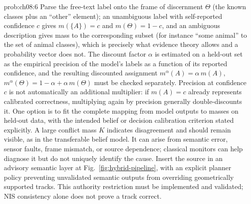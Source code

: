 \begin{sol}{prob:ch08:6}
Parse the free-text label onto the frame of discernment $\Theta$ (the known classes plus an ``other'' element); an unambiguous label with self-reported confidence $c$ gives $m(\{A\})=c$ and $m(\Theta)=1-c$, and an ambiguous description gives mass to the corresponding subset (for instance ``some animal'' to the set of animal classes), which is precisely what evidence theory allows and a probability vector does not. The discount factor $\alpha$ is estimated on a held-out set as the empirical precision of the model's labels as a function of its reported confidence, and the resulting discounted assignment $m^\alpha(A)=\alpha\,m(A)$, $m^\alpha(\Theta)=1-\alpha+\alpha\,m(\Theta)$ must be checked separately. Precision at confidence $c$ is not automatically an additional multiplier: if $m(A)=c$ already represents calibrated correctness, multiplying again by precision generally double-discounts it. One option is to fit the complete mapping from model outputs to masses on held-out data, with the intended belief or decision calibration criterion stated explicitly. A large conflict mass $K$ indicates disagreement and should remain visible, as in the transferable belief model. It can arise from semantic error, sensor faults, frame mismatch, or source dependence; classical monitors can help diagnose it but do not uniquely identify the cause. Insert the source in an advisory semantic layer at Fig.~\ref{fig:hybrid-pipeline}, with an explicit planner policy preventing unvalidated semantic outputs from overriding geometrically supported tracks. This authority restriction must be implemented and validated; NIS consistency alone does not prove a track correct.
\end{sol}
